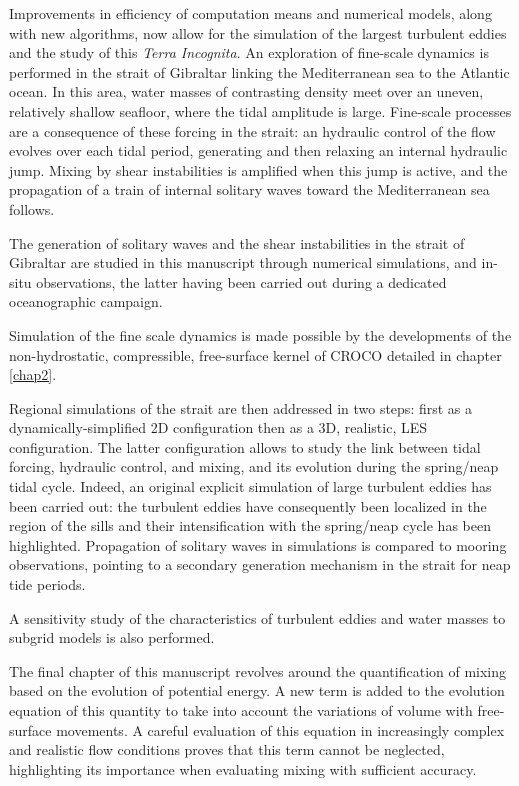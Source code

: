 \documentclass[a4paper,12pt,notitlepage,twoside]{report}
\numberwithin{equation}{section}
\begin{document}
Improvements in efficiency of computation means and numerical models, along with new algorithms, now allow for the simulation of the largest turbulent eddies and the study of this \textit{Terra Incognita}. An exploration of fine-scale dynamics is performed in the strait of Gibraltar linking the Mediterranean sea to the Atlantic ocean. In this area, water masses of contrasting density meet over an uneven, relatively shallow seafloor, where the tidal amplitude is large. Fine-scale processes are a consequence of these forcing in the strait: an hydraulic control of the flow evolves over each tidal period, generating and then relaxing an internal hydraulic jump. Mixing by shear instabilities is amplified when this jump is active, and the propagation of a train of internal solitary waves toward the Mediterranean sea follows.

The generation of solitary waves and the shear instabilities in the strait of Gibraltar are studied in this manuscript through numerical simulations, and in-situ observations, the latter having been carried out during a dedicated oceanographic campaign.

Simulation of the fine scale dynamics is made possible by the developments of the non-hydrostatic, compressible, free-surface kernel of CROCO detailed in chapter \ref{chap2}.

Regional simulations of the strait are then addressed in two steps: first as a dynamically-simplified 2D configuration then as a 3D, realistic, LES configuration. The latter configuration allows to study the link between tidal forcing, hydraulic control, and mixing, and its evolution during the spring/neap tidal cycle. Indeed, an original explicit simulation of large turbulent eddies has been carried out: the turbulent eddies have consequently been localized in the region of the sills and their intensification with the spring/neap cycle has been highlighted. Propagation of solitary waves in simulations is compared to mooring observations, pointing to a secondary generation mechanism in the strait for neap tide periods.

A sensitivity study of the characteristics of turbulent eddies and water masses to subgrid models is also performed.

The final chapter of this manuscript revolves around the quantification of mixing based on the evolution of potential energy. A new term is added to the evolution equation of this quantity to take into account the variations of volume with free-surface movements. A careful evaluation of this equation in increasingly complex and realistic flow conditions proves that this term cannot be neglected, highlighting its importance when evaluating mixing with sufficient accuracy.
\end{document}
